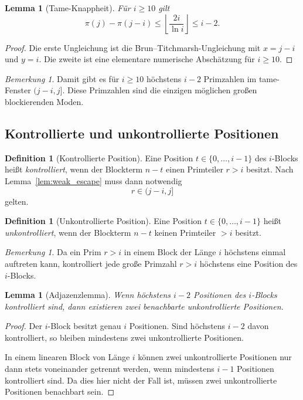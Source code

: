 \documentclass[12pt,a4paper]{article}
\theoremstyle{plain}
\newtheorem{lemma}[theorem]{Lemma}
\theoremstyle{definition}
\newtheorem{definition}[theorem]{Definition}
\theoremstyle{remark}
\newtheorem{remark}[theorem]{Bemerkung}
\begin{document}
	\begin{lemma}[Tame-Knappheit]
		\label{lem:tame_scarcity_global}
		Für \(i\ge10\) gilt
		\[
		\pi(j)-\pi(j-i)\le \left\lfloor \frac{2i}{\ln i}\right\rfloor \le i-2.
		\]
	\end{lemma}
	
	\begin{proof}
		Die erste Ungleichung ist die Brun--Titchmarsh-Ungleichung mit \(x=j-i\) und \(y=i\). Die zweite ist eine elementare numerische Abschätzung für \(i\ge10\).
	\end{proof}
	
	\begin{remark}
		Damit gibt es für \(i\ge10\) höchstens \(i-2\) Primzahlen im tame-Fenster \((j-i,j]\). Diese Primzahlen sind die einzigen möglichen großen blockierenden Moden.
	\end{remark}
	
	\subsection{Kontrollierte und unkontrollierte Positionen}
	
	\begin{definition}[Kontrollierte Position]
		Eine Position \(t\in\{0,\dots,i-1\}\) des \(i\)-Blocks heißt \emph{kontrolliert}, wenn
		der Blockterm \(n-t\) einen Primteiler \(r>i\) besitzt. Nach Lemma~\ref{lem:weak_escape}
		muss dann notwendig
		\[
		r\in(j-i,j]
		\]
		gelten.
	\end{definition}
	
	\begin{definition}[Unkontrollierte Position]
		Eine Position \(t\in\{0,\dots,i-1\}\) heißt \emph{unkontrolliert}, wenn der Blockterm
		\(n-t\) keinen Primteiler \(>i\) besitzt.
	\end{definition}
	
	\begin{remark}
		Da ein Prim \(r>i\) in einem Block der Länge \(i\) höchstens einmal auftreten kann,
		kontrolliert jede große Primzahl \(r>i\) höchstens eine Position des \(i\)-Blocks.
	\end{remark}
	
	\begin{lemma}[Adjazenzlemma]
		\label{lem:adjacency_global}
		Wenn höchstens \(i-2\) Positionen des \(i\)-Blocks kontrolliert sind, dann existieren
		zwei benachbarte unkontrollierte Positionen.
	\end{lemma}
	
	\begin{proof}
		Der \(i\)-Block besitzt genau \(i\) Positionen. Sind höchstens \(i-2\) davon kontrolliert,
		so bleiben mindestens zwei unkontrollierte Positionen.
		
		In einem linearen Block von Länge \(i\) können zwei unkontrollierte Positionen nur dann
		stets voneinander getrennt werden, wenn mindestens \(i-1\) Positionen kontrolliert sind.
		Da dies hier nicht der Fall ist, müssen zwei unkontrollierte Positionen benachbart sein.
	\end{proof}
	
\end{document}
